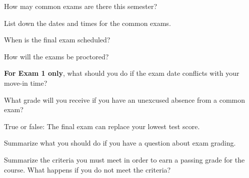 \documentclass{exam}
\numberwithin{equation}{section} %
\numberwithin{figure}{section} %
\numberwithin{table}{section} %
\begin{document}
\begin{questions}
\question How may common exams are there this semester?
\begin{solution}[\stretch{1}]

\end{solution}

\newpage

\question List down the dates and times for the common exams. 
\begin{solution}[\stretch{1}]

\end{solution}

\question When is the final exam scheduled?
\begin{solution}[\stretch{1}]

\end{solution}


\question How will the exams be proctored?
\begin{solution}[\stretch{1}]

\end{solution}

\question \textbf{For Exam 1 only}, what should you do if the exam date conflicts with your move-in time? 
\begin{solution}[\stretch{1}]

\end{solution}

\question What grade will you receive if you have an unexcused absence from a common exam?
\begin{solution}[\stretch{1}]

\end{solution}

\newpage

\question True or false: The final exam can replace your lowest test score.
\begin{solution}[\stretch{1}]

\end{solution}

\question Summarize what you should do if you have a question about exam grading. 
\begin{solution}[\stretch{1}]

\end{solution}


\question Summarize the criteria you must meet in order to earn a passing grade for the course. What happens if you do not meet the criteria?
\begin{solution}[\stretch{2}]


\end{solution}
\end{questions}
\end{document}
